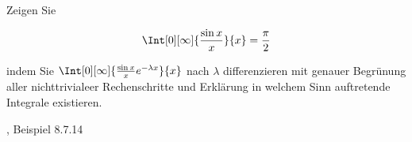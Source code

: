 
\begin{exercise}

Zeigen Sie

\begin{align*}
    \Int[0][\infty]
    {
        \frac{\sin x}{x}
    }{x}
    =
    \frac{\pi}{2}
\end{align*}

indem Sie $\Int[0][\infty]{\frac{\sin x}{x} e^{-\lambda x}}{x}$ nach $\lambda$ differenzieren mit genauer Begrünung aller nichttrivialeer Rechenschritte und Erklärung in welchem Sinn auftretende Integrale existieren.

\end{exercise}


\begin{solution}

\cite{Ana1&2}, Beispiel 8.7.14

\end{solution}


